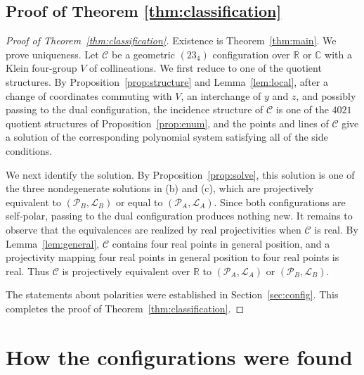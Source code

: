 \documentclass[11pt]{article}
\theoremstyle{plain}
\theoremstyle{definition}
\newcommand{\RR}{\mathbb{R}}
\newcommand{\CC}{\mathbb{C}}
\newcommand{\cP}{\mathcal{P}}
\newcommand{\cL}{\mathcal{L}}
\newcommand{\cC}{\mathcal{C}}
\begin{document}
\subsection{Proof of Theorem \ref{thm:classification}}

\begin{proof}[Proof of Theorem~\ref{thm:classification}]
Existence is Theorem~\ref{thm:main}.  We prove uniqueness.  Let $\cC$ be a geometric $(23_4)$ configuration over $\RR$ or $\CC$ with a Klein four-group $V$ of collineations.  We first reduce to one of the quotient structures.  By Proposition~\ref{prop:structure} and Lemma~\ref{lem:local}, after a change of coordinates commuting with $V$, an interchange of $y$ and $z$, and possibly passing to the dual configuration, the incidence structure of $\cC$ is one of the $4021$ quotient structures of Proposition~\ref{prop:enum}, and the points and lines of $\cC$ give a solution of the corresponding polynomial system satisfying all of the side conditions.

We next identify the solution.  By Proposition~\ref{prop:solve}, this solution is one of the three nondegenerate solutions in (b) and (c), which are projectively equivalent to $(\cP_B,\cL_B)$ or equal to $(\cP_A,\cL_A)$.  Since both configurations are self-polar, passing to the dual configuration produces nothing new.  It remains to observe that the equivalences are realized by real projectivities when $\cC$ is real.  By Lemma~\ref{lem:general}, $\cC$ contains four real points in general position, and a projectivity mapping four real points in general position to four real points is real.  Thus $\cC$ is projectively equivalent over $\RR$ to $(\cP_A,\cL_A)$ or $(\cP_B,\cL_B)$.

The statements about polarities were established in Section~\ref{sec:config}.  This completes the proof of Theorem~\ref{thm:classification}.
\end{proof}

\section{How the configurations were found}\label{sec:search}
\end{document}
